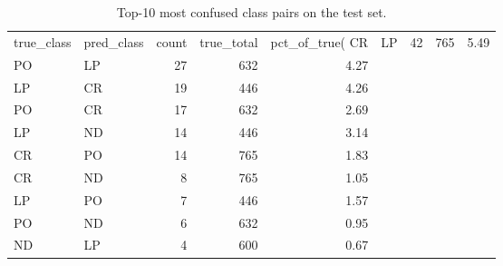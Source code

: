 \begin{table}
\caption{Top-10 most confused class pairs on the test set.}
\label{tab:most_confused}
\begin{tabular}{llrrr}
\toprule
true_class & pred_class & count & true_total & pct_of_true(%
\midrule
CR & LP & 42 & 765 & 5.49 \\
PO & LP & 27 & 632 & 4.27 \\
LP & CR & 19 & 446 & 4.26 \\
PO & CR & 17 & 632 & 2.69 \\
LP & ND & 14 & 446 & 3.14 \\
CR & PO & 14 & 765 & 1.83 \\
CR & ND & 8 & 765 & 1.05 \\
LP & PO & 7 & 446 & 1.57 \\
PO & ND & 6 & 632 & 0.95 \\
ND & LP & 4 & 600 & 0.67 \\
\bottomrule
\end{tabular}
\end{table}
